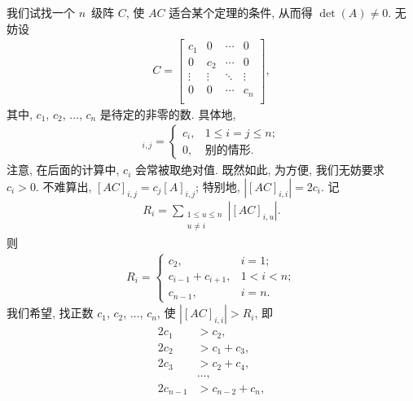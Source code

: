 \documentclass[../libro.tex]{subfiles}
\begin{document}
\begin{example}
    我们试找一个 \(n\)~级阵 \(C\),
    使 \(AC\) 适合某个定理的条件,
    从而得 \(\det {(A)} \neq 0\).
    无妨设
    \begin{align*}
        C =
        \begin{bmatrix}
            c_1    & 0      & \cdots & 0      \\
            0      & c_2    & \cdots & 0      \\
            \vdots & \vdots & \ddots & \vdots \\
            0      & 0      & \cdots & c_n    \\
        \end{bmatrix},
    \end{align*}
    其中, \(c_1\), \(c_2\), \(\dots\), \(c_n\) 是待定的非零的数.
    具体地,
    \begin{align*}
        [C]_{i,j} =
        \begin{cases}
            c_i, & 1 \leq i = j \leq n; \\
            0,   & \text{别的情形}.
        \end{cases}
    \end{align*}
    注意, 在后面的计算中, \(c_i\) 会常被取绝对值.
    既然如此, 为方便, 我们无妨要求 \(c_i > 0\).
    不难算出, \([AC]_{i,j} = c_j [A]_{i,j}\);
    特别地, \(|[AC]_{i,i}| = 2c_i\).
    记
    \begin{align*}
        R_i = \sum_{\substack{1 \leq u \leq n \\ u \neq i}}
        {|[AC]_{i,u}|}.
    \end{align*}
    则
    \begin{align*}
        R_i =
        \begin{cases}
            c_2,               & i = 1;     \\
            c_{i-1} + c_{i+1}, & 1 < i < n; \\
            c_{n-1},           & i = n.
        \end{cases}
    \end{align*}
    我们希望, 找正数 \(c_1\), \(c_2\), \(\dots\), \(c_n\),
    使 \(|[AC]_{i,i}| > R_i\), 即
    \begin{align*}
        2c_1     & > c_2,           \\
        2c_2     & > c_1 + c_3,     \\
        2c_3     & > c_2 + c_4,     \\
        & \dots, \\
        2c_{n-1} & > c_{n-2} + c_n, \\

\end{align*}
\end{example}
\end{document}
